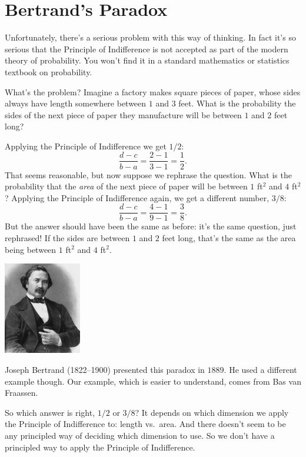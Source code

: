 \documentclass[justified]{tufte-book}
\theoremstyle{definition}
\theoremstyle{definition}
\theoremstyle{definition}
\theoremstyle{definition}
\theoremstyle{remark}
\begin{document}
\hypertarget{bertrands-paradox}{%
\section{Bertrand's Paradox}\label{bertrands-paradox}}

Unfortunately, there's a serious problem with this way of thinking. In fact it's so serious that the Principle of Indifference is not accepted as part of the modern theory of probability. You won't find it in a standard mathematics or statistics textbook on probability.

What's the problem? Imagine a factory makes square pieces of paper, whose sides always have length somewhere between \(1\) and \(3\) feet. What is the probability the sides of the next piece of paper they manufacture will be between \(1\) and \(2\) feet long?

Applying the Principle of Indifference we get \(1/2\):
\[ \frac{d-c}{b-a} = \frac{2-1}{3-1} = \frac{1}{2}. \]
That seems reasonable, but now suppose we rephrase the question. What is the probability that the \emph{area} of the next piece of paper will be between \(1\) ft\(^2\) and \(4\) ft\(^2\)? Applying the Principle of Indifference again, we get a different number, \(3/8\):
\[ \frac{d-c}{b-a} = \frac{4-1}{9-1} = \frac{3}{8}. \]
But the answer should have been the same as before: it's the same question, just rephrased! If the sides are between \(1\) and \(2\) feet long, that's the same as the area being between \(1\) ft\(^2\) and \(4\) ft\(^2\).

\begin{marginfigure}
\includegraphics[width=1.33in]{img/bertrand} \caption[Joseph Bertrand (1822--1900) presented this paradox in $1889$]{Joseph Bertrand (1822--1900) presented this paradox in $1889$. He used a different example though. Our example, which is easier to understand, comes from  Bas van Fraassen.}\label{fig:unnamed-chunk-136}
\end{marginfigure}

So which answer is right, \(1/2\) or \(3/8\)? It depends on which dimension we apply the Principle of Indifference to: length vs.~area. And there doesn't seem to be any principled way of deciding which dimension to use. So we don't have a principled way to apply the Principle of Indifference.
\end{document}
